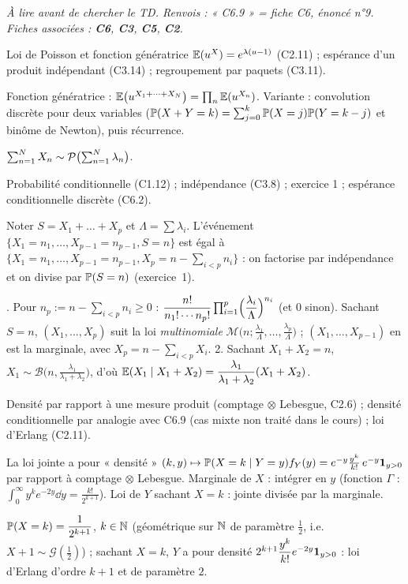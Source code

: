 \documentclass[11pt,a4paper]{article}
\begin{document}

\textit{À lire avant de chercher le TD. Renvois : « C6.9 » = fiche C6, énoncé n°9. Fiches associées : \textbf{C6}, \textbf{C3}, \textbf{C5}, \textbf{C2}.}

\begin{exo}
\outils Loi de Poisson et fonction génératrice $\mathbb{E}(u^X)=e^{\lambda(u-1)}$ (C2.11) ; espérance d'un produit indépendant (C3.14) ;
regroupement par paquets (C3.11).

\meth Fonction génératrice : $\mathbb{E}\bigl(u^{X_1+\dots+X_N}\bigr)=\prod_n\mathbb{E}(u^{X_n})$. Variante : convolution discrète pour deux variables
($\mathbb{P}(X+Y=k)=\sum_{j=0}^k\mathbb{P}(X=j)\mathbb{P}(Y=k-j)$ et binôme de Newton), puis récurrence.

\rep $\sum_{n=1}^NX_n\sim\mathcal{P}\bigl(\sum_{n=1}^N\lambda_n\bigr)$.
\end{exo}

\begin{exo}
\outils Probabilité conditionnelle (C1.12) ; indépendance (C3.8) ; exercice 1 ; espérance conditionnelle discrète (C6.2).

\meth Noter $S=X_1+\dots+X_p$ et $\Lambda=\sum\lambda_i$. L'événement $\{X_1=n_1,\dots,X_{p-1}=n_{p-1},S=n\}$ est égal à
$\{X_1=n_1,\dots,X_{p-1}=n_{p-1},X_p=n-\sum_{i<p}n_i\}$ : on factorise par indépendance et on divise par $\mathbb{P}(S=n)$ (exercice~1).

. Pour $n_p:=n-\sum_{i<p}n_i\ge0$ :
$\dfrac{n!}{n_1!\cdots n_p!}\prod_{i=1}^p\Bigl(\dfrac{\lambda_i}{\Lambda}\Bigr)^{n_i}$ (et $0$ sinon). Sachant $S=n$, $(X_1,\dots,X_p)$ suit la loi
\emph{multinomiale} $\mathcal M\bigl(n;\frac{\lambda_1}\Lambda,\dots,\frac{\lambda_p}\Lambda\bigr)$ ; $(X_1,\dots,X_{p-1})$ en est la marginale, avec $X_p=n-\sum_{i<p}X_i$.
2. Sachant $X_1+X_2=n$, $X_1\sim\mathcal B\bigl(n,\frac{\lambda_1}{\lambda_1+\lambda_2}\bigr)$, d'où
$\mathbb{E}(X_1\mid X_1+X_2)=\dfrac{\lambda_1}{\lambda_1+\lambda_2}(X_1+X_2)$.
\end{exo}

\begin{exo}
\outils Densité par rapport à une mesure produit (comptage $\otimes$ Lebesgue, C2.6) ; densité conditionnelle par analogie avec C6.9 (cas mixte non traité dans le cours) ; loi d'Erlang (C2.11).

\meth La loi jointe a pour « densité » $(k,y)\mapsto\mathbb{P}(X=k\mid Y=y)f_Y(y)=e^{-y}\frac{y^k}{k!}\,e^{-y}\mathbf{1}_{y>0}$ par rapport à
comptage $\otimes$ Lebesgue. Marginale de $X$ : intégrer en $y$ (fonction $\Gamma$ : $\int_0^\infty y^ke^{-2y}\dd y=\frac{k!}{2^{k+1}}$).
Loi de $Y$ sachant $X=k$ : jointe divisée par la marginale.

\rep $\mathbb{P}(X=k)=\dfrac1{2^{k+1}}$, $k\in\mathbb{N}$ (géométrique sur $\mathbb{N}$ de paramètre $\frac12$, i.e.\ $X+1\sim\mathcal G(\frac12)$) ;
sachant $X=k$, $Y$ a pour densité $2^{k+1}\dfrac{y^k}{k!}e^{-2y}\mathbf{1}_{y>0}$ : loi d'Erlang d'ordre $k+1$ et de paramètre $2$.
\end{exo}
\end{document}
